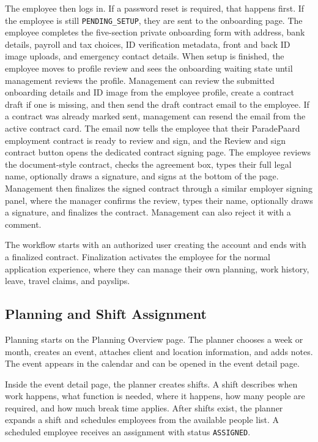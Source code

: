 \documentclass[11pt]{article}
\newcommand{\code}[1]{\nolinkurl{#1}}
\begin{document}
The employee then logs in. If a password reset is required, that happens first. If the employee is still \code{PENDING_SETUP}, they are sent to the onboarding page. The employee completes the five-section private onboarding form with address, bank details, payroll and tax choices, ID verification metadata, front and back ID image uploads, and emergency contact details. When setup is finished, the employee moves to profile review and sees the onboarding waiting state until management reviews the profile. Management can review the submitted onboarding details and ID image from the employee profile, create a contract draft if one is missing, and then send the draft contract email to the employee. If a contract was already marked sent, management can resend the email from the active contract card. The email now tells the employee that their ParadePaard employment contract is ready to review and sign, and the Review and sign contract button opens the dedicated contract signing page. The employee reviews the document-style contract, checks the agreement box, types their full legal name, optionally draws a signature, and signs at the bottom of the page. Management then finalizes the signed contract through a similar employer signing panel, where the manager confirms the review, types their name, optionally draws a signature, and finalizes the contract. Management can also reject it with a comment.

The workflow starts with an authorized user creating the account and ends with a finalized contract. Finalization activates the employee for the normal application experience, where they can manage their own planning, work history, leave, travel claims, and payslips.

\subsection{Planning and Shift Assignment}

Planning starts on the Planning Overview page. The planner chooses a week or month, creates an event, attaches client and location information, and adds notes. The event appears in the calendar and can be opened in the event detail page.

Inside the event detail page, the planner creates shifts. A shift describes when work happens, what function is needed, where it happens, how many people are required, and how much break time applies. After shifts exist, the planner expands a shift and schedules employees from the available people list. A scheduled employee receives an assignment with status \code{ASSIGNED}.
\end{document}
